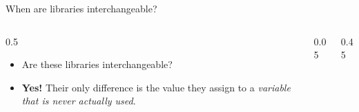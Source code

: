 \ifdefined\PRESENTATION\else\PassOptionsToClass{handout}{beamer}\fi\documentclass[aspectratio=169, lualatex]{beamer}
\begin{document}
\begin{frame}{When are libraries interchangeable?}
	\begin{columns}[c]
		\begin{column}{0.5\textwidth}
			\begin{itemize}[<+->]
				\item Are these libraries interchangeable?
				\item \textbf{Yes!} Their only difference is the value they assign to a \textit{variable that is never actually used}.
			\end{itemize}
		\end{column}
		\begin{column}{0.05\textwidth}
		\end{column}
		\begin{column}{0.45\textwidth}
		\end{column}
	\end{columns}
\end{frame}
\end{document}
